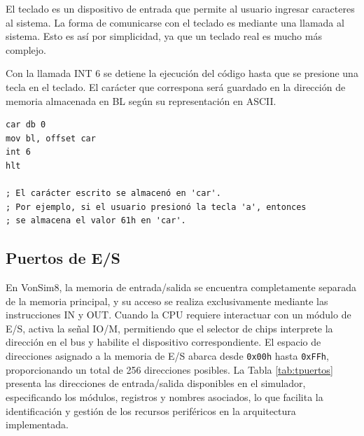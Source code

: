 \documentclass[12pt,oneside]{templates/unerthesis}
\begin{document}
El teclado es un dispositivo de entrada que permite al usuario ingresar caracteres al sistema. La forma de comunicarse con el teclado es mediante una llamada al sistema. Esto es así por simplicidad, ya que un teclado real es mucho más complejo.

Con la llamada INT 6 se detiene la ejecución del código hasta que se presione una tecla en el teclado. El carácter que correspona será guardado en la dirección de memoria almacenada en BL según su representación en ASCII.

\begin{lstlisting}
car db 0
mov bl, offset car
int 6
hlt

; El carácter escrito se almacenó en 'car'.
; Por ejemplo, si el usuario presionó la tecla 'a', entonces
; se almacena el valor 61h en 'car'.\end{lstlisting}

\hypertarget{puertos-de-es}{%
\subsection{Puertos de E/S}\label{puertos-de-es}}

En VonSim8, la memoria de entrada/salida se encuentra completamente separada de la memoria principal, y su acceso se realiza exclusivamente mediante las instrucciones IN y OUT. Cuando la CPU requiere interactuar con un módulo de E/S, activa la señal IO/M, permitiendo que el selector de chips interprete la dirección en el bus y habilite el dispositivo correspondiente. El espacio de direcciones asignado a la memoria de E/S abarca desde \texttt{0x00h} hasta \texttt{0xFFh}, proporcionando un total de 256 direcciones posibles. La Tabla \ref{tab:tpuertos} presenta las direcciones de entrada/salida disponibles en el simulador, especificando los módulos, registros y nombres asociados, lo que facilita la identificación y gestión de los recursos periféricos en la arquitectura implementada.
\end{document}

